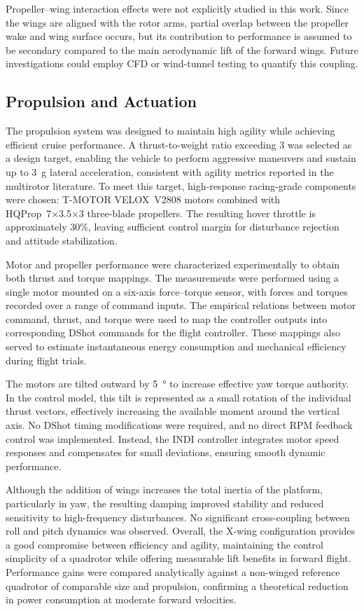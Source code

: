 Propeller–wing interaction effects were not explicitly studied in this work.  
Since the wings are aligned with the rotor arms, partial overlap between the propeller wake and wing surface occurs, but its contribution to performance is assumed to be secondary compared to the main aerodynamic lift of the forward wings.  
Future investigations could employ CFD or wind-tunnel testing to quantify this coupling.

\subsection{Propulsion and Actuation}

The propulsion system was designed to maintain high agility while achieving efficient cruise performance.  
A thrust-to-weight ratio exceeding 3 was selected as a design target, enabling the vehicle to perform aggressive maneuvers and sustain up to \SI{3}{g} lateral acceleration, consistent with agility metrics reported in the multirotor literature.  
To meet this target, high-response racing-grade components were chosen:  
T-MOTOR VELOX~V2808 motors combined with HQProp~7×3.5×3 three-blade propellers.  
The resulting hover throttle is approximately 30\%, leaving sufficient control margin for disturbance rejection and attitude stabilization.

Motor and propeller performance were characterized experimentally to obtain both thrust and torque mappings.  
The measurements were performed using a single motor mounted on a six-axis force–torque sensor, with forces and torques recorded over a range of command inputs.  
The empirical relations between motor command, thrust, and torque were used to map the controller outputs into corresponding DShot commands for the flight controller.  
These mappings also served to estimate instantaneous energy consumption and mechanical efficiency during flight trials.

The motors are tilted outward by \SI{5}{\degree} to increase effective yaw torque authority.  
In the control model, this tilt is represented as a small rotation of the individual thrust vectors, effectively increasing the available moment around the vertical axis.  
No DShot timing modifications were required, and no direct RPM feedback control was implemented.  
Instead, the INDI controller integrates motor speed responses and compensates for small deviations, ensuring smooth dynamic performance.

Although the addition of wings increases the total inertia of the platform, particularly in yaw, the resulting damping improved stability and reduced sensitivity to high-frequency disturbances.  
No significant cross-coupling between roll and pitch dynamics was observed.  
Overall, the X-wing configuration provides a good compromise between efficiency and agility, maintaining the control simplicity of a quadrotor while offering measurable lift benefits in forward flight.  
Performance gains were compared analytically against a non-winged reference quadrotor of comparable size and propulsion, confirming a theoretical reduction in power consumption at moderate forward velocities.

